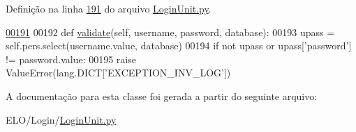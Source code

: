 Definição na linha \hyperlink{LoginUnit_8py_source_l00191}{191} do arquivo \hyperlink{LoginUnit_8py_source}{Login\-Unit.\-py}.


\begin{DoxyCode}
\hypertarget{classLogin_1_1LoginUnit_1_1BusLogin_l00191}{}\hyperlink{classLogin_1_1LoginUnit_1_1BusLogin_a2301425767b811697ce559801b955a58}{00191} 
00192     \textcolor{keyword}{def }\hyperlink{classLogin_1_1LoginUnit_1_1BusLogin_a2301425767b811697ce559801b955a58}{validate}(self, username, password, database):
00193         upass = self.pers.select(username.value, database)
00194         \textcolor{keywordflow}{if} \textcolor{keywordflow}{not} upass \textcolor{keywordflow}{or} upass[\textcolor{stringliteral}{'password'}] != password.value:
00195             \textcolor{keywordflow}{raise} ValueError(lang.DICT[\textcolor{stringliteral}{'EXCEPTION\_INV\_LOG'}])

\end{DoxyCode}


A documentação para esta classe foi gerada a partir do seguinte arquivo\-:\begin{DoxyCompactItemize}
\item 
E\-L\-O/\-Login/\hyperlink{LoginUnit_8py}{Login\-Unit.\-py}\end{DoxyCompactItemize}
